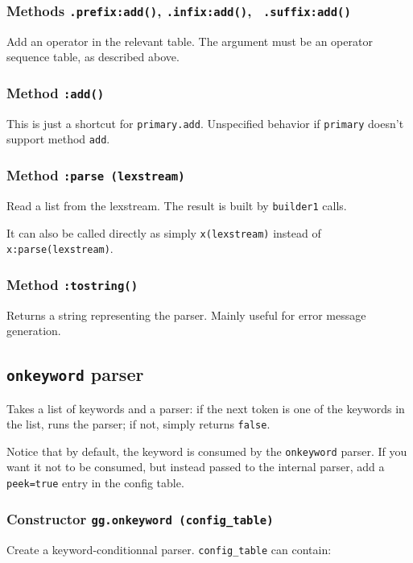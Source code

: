 \subsubsection{Methods {\tt .prefix:add()}, {\tt .infix:add()}, {\tt
    .suffix:add()}}
Add an operator in the relevant table. The argument must be an
operator sequence table, as described above.

\subsubsection{Method {\tt :add()}}
This is just a shortcut for {\tt primary.add}. Unspecified behavior if
{\tt primary} doesn't support method {\tt add}.


\subsubsection{Method {\tt :parse (lexstream)}}
Read a list from the lexstream. The result is built by \verb|builder1| calls.

It can also be called directly as simply \verb|x(lexstream)| instead of
\verb|x:parse(lexstream)|.

\subsubsection{Method {\tt :tostring()}}

Returns a string representing the parser. Mainly useful for error
message generation.

\subsection{{\tt onkeyword} parser}

Takes a list of keywords and a parser: if the next token is one of the
keywords in the list, runs the parser; if not, simply returns
\verb|false|.

Notice that by default, the keyword is consumed by the
\verb|onkeyword| parser. If you want it not to be consumed, but
instead passed to the internal parser, add a \verb|peek=true| entry in
the config table.

\subsubsection{Constructor {\tt gg.onkeyword (config\_table)}}

Create a keyword-conditionnal parser. \verb|config_table| can contain:

